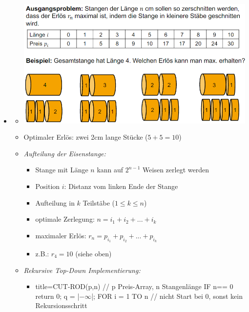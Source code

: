 \documentclass[
    12pt,
    a4paper,
    ngerman,
    color=3b,%
    marginpar=false,
    colorback=false,
    leqno,
]{tudaexercise}
\begin{document}
\begin{itemize}
        \item {}
            \begin{itemize}
                \item[] \includegraphics[width=12cm]{pictures/stabzerlegungsproblem.PNG}
                \item[] Optimaler Erlös: zwei 2cm lange Stücke ($5+5=10$) 
                \item \textit{Aufteilung der Eisenstange:}
                    \begin{itemize}
                        \item Stange mit Länge $n$ kann auf $2^{n-1}$ Weisen zerlegt werden
                        \item Position $i$: Distanz vom linken Ende der Stange
                        \item Aufteilung in $k$ Teilstäbe ($1 \leq k \leq n$)
                        \item optimale Zerlegung: $n = i_1 + i_2 + ... + i_k$
                        \item maximaler Erlös: $r_n = p_{i_1} + p_{i_2} + ... + p_{i_k}$
                        \item z.B.: $r_4 = 10$ (siehe oben)
                    \end{itemize}
\pagebreak
                \item \textit{Rekursive Top-Down Implementierung:}
                    \begin{itemize}
                        \item[]
                            \begin{ccode}[autogobble,escapeinside=||]{title={CUT-ROD(p,n)    // p Preis-Array, n Stangenlänge}}
                            IF n== 0
                                return 0;
                            q = |$-\infty$|;
                            FOR i = 1 TO n  // nicht Start bei 0, sonst kein Rekursionsschritt

\end{ccode}
\end{itemize}
\end{itemize}
\end{itemize}
\end{document}
